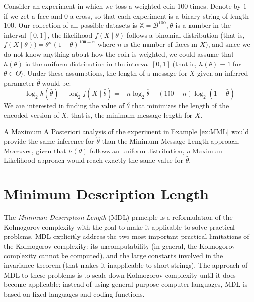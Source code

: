 {\begin{example}
\label{ex:MML}
Consider an experiment in which we toss a weighted coin $100$ times. Denote by $1$ if we get a face and $0$ a cross, so that each experiment is a binary string of length $100$. Our collection of all possible datasets is $\mathbb{X} = \mathcal{B}^{100}$, $\theta$ is a number in the interval $[0, 1]$, the likelihood $f (X \mid \theta)$ follows a binomial distribution (that is, $f (X \mid \theta) ) = \theta^n (1-\theta)^{100-n}$ where $n$ is the number of faces in $X$), and since we do not know anything about how the coin is weighted, we could assume that $h(\theta)$ is the uniform distribution in the interval $[0, 1]$ (that is, $h(\theta) = 1$ for $\theta \in \Theta$). Under these assumptions, the length of a message for $X$ given an inferred parameter $\hat\theta$ would be:
\[
- \log_2 h \left( \hat\theta \right) - \log_2 f \left( X \mid \hat\theta \right) = - n \log_2 \hat\theta - (100-n) \log_2 (1 - \hat\theta)
\]
We are interested in finding the value of $\hat\theta$ that minimizes the length of the encoded version of $X$, that is, the minimum message length for $X$.
\end{example}

A Maximum A Posteriori analysis of the experiment in Example \ref{ex:MML} would provide the same inference for $\hat\theta$ than the Minimum Message Length approach. Moreover, given that $h(\theta)$ follows an uniform distribution, a Maximum Likelihood approach would reach exactly the same value for $\hat\theta$.

%
%
\section{Minimum Description Length}
\label{sec:MDL}

The \emph{Minimum Description Length} (MDL) principle is a reformulation
of the Kolmogorov complexity with the goal to make it applicable to
solve practical problems. MDL explicitly address the two most important
practical limitations of the Kolmogorov complexity: its uncomputability
(in general, the Kolmogorov complexity cannot be computed), and the
large constants involved in the invariance theorem (that makes it
inapplicable to short strings). The approach of MDL to these problems
is to scale down Kolmogorov complexity until it does become applicable:
instead of using general-purpose computer languages, MDL is based
on fixed languages and coding functions.

}

